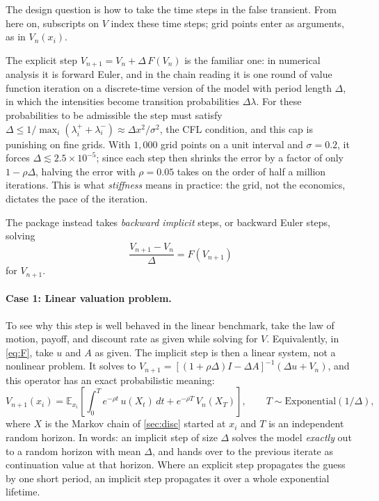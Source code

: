 \documentclass[11pt]{article}
\numberwithin{equation}{section}
\begin{document}
	The design question is how to take the time steps in the false transient. From here on, subscripts on $V$ index these time steps; grid points enter as arguments, as in $V_n(x_i)$.

	The explicit step $V_{n+1} = V_n + \Delta\, F(V_n)$ is the familiar one: in numerical analysis it is forward Euler, and in the chain reading it is one round of value function iteration on a discrete-time version of the model with period length $\Delta$, in which the intensities become transition probabilities $\Delta \lambda$. For these probabilities to be admissible the step must satisfy $\Delta \le 1/\max_i (\lambda^+_i + \lambda^-_i) \approx \Delta x^2 / \sigma^2$, the CFL condition, and this cap is punishing on fine grids. With $1{,}000$ grid points on a unit interval and $\sigma = 0.2$, it forces $\Delta \lesssim 2.5 \times 10^{-5}$; since each step then shrinks the error by a factor of only $1 - \rho\Delta$, halving the error with $\rho = 0.05$ takes on the order of half a million iterations. This is what \emph{stiffness} means in practice: the grid, not the economics, dictates the pace of the iteration.

		The package instead takes \emph{backward implicit} steps, or backward Euler steps, solving
		\begin{equation}\label{eq:step}
			\frac{V_{n+1}-V_n}{\Delta} = F(V_{n+1})
		\end{equation}
		for $V_{n+1}$.

					\paragraph*{Case 1: Linear valuation problem.} To see why this step is well behaved in the linear benchmark, take the law of motion, payoff, and discount rate as given while solving for $V$. Equivalently, in \eqref{eq:F}, take $u$ and $A$ as given. The implicit step is then a linear system, not a nonlinear problem. It solves to $V_{n+1} = \left[(1+\rho\Delta) I - \Delta A\right]^{-1}\left(\Delta u + V_n\right)$, and this operator has an exact probabilistic meaning:
		\begin{equation}\label{eq:horizon}
			V_{n+1}(x_i) = \mathbb{E}_{x_i}\left[\int_0^T e^{-\rho t}\, u(X_t)\, dt + e^{-\rho T}\, V_n(X_T)\right], \qquad T \sim \text{Exponential}(1/\Delta),
		\end{equation}
	where $X$ is the Markov chain of \cref{sec:disc} started at $x_i$ and $T$ is an independent random horizon. In words: an implicit step of size $\Delta$ solves the model \emph{exactly} out to a random horizon with mean $\Delta$, and hands over to the previous iterate as continuation value at that horizon. Where an explicit step propagates the guess by one short period, an implicit step propagates it over a whole exponential lifetime.
\end{document}

